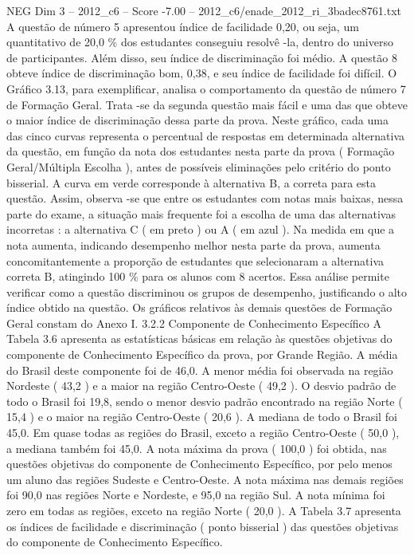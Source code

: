 \begin{textsample}{NEG Dim 3 – 2012\_c6 – Score -7.00 – 2012\_c6/enade\_2012\_ri\_3badec8761.txt}
A questão de número 5 apresentou índice de facilidade 0,20, ou seja, um quantitativo de 20,0 \% dos estudantes conseguiu resolvê -la, dentro do universo de participantes.
Além disso, seu índice de discriminação foi médio.
A questão 8 obteve índice de discriminação bom, 0,38, e seu índice de facilidade foi difícil.
O Gráfico 3.13, para exemplificar, analisa o comportamento da questão de número 7 de Formação Geral.
Trata -se da segunda questão mais fácil e uma das que obteve o maior índice de discriminação dessa parte da prova.
Neste gráfico, cada uma das cinco curvas representa o percentual de respostas em determinada alternativa da questão, em função da nota dos estudantes nesta parte da prova ( Formação Geral/Múltipla Escolha ), antes de possíveis eliminações pelo critério do ponto bisserial.
A curva em verde corresponde à alternativa B, a correta para esta questão.
Assim, observa -se que entre os estudantes com notas mais baixas, nessa parte do exame, a situação mais frequente foi a escolha de uma das alternativas incorretas : a alternativa C ( em preto ) ou A ( em azul ).
Na medida em que a nota aumenta, indicando desempenho melhor nesta parte da prova, aumenta concomitantemente a proporção de estudantes que selecionaram a alternativa correta B, atingindo 100 \% para os alunos com 8 acertos.
Essa análise permite verificar como a questão discriminou os grupos de desempenho, justificando o alto índice obtido na questão.
Os gráficos relativos às demais questões de Formação Geral constam do Anexo I. 3.2.2 Componente de Conhecimento Específico A Tabela 3.6 apresenta as estatísticas básicas em relação às questões objetivas do componente de Conhecimento Específico da prova, por Grande Região.
A média do Brasil deste componente foi de 46,0.
A menor média foi observada na região Nordeste ( 43,2 ) e a maior na região Centro-Oeste ( 49,2 ).
O desvio padrão de todo o Brasil foi 19,8, sendo o menor desvio padrão encontrado na região Norte ( 15,4 ) e o maior na região Centro-Oeste ( 20,6 ).
A mediana de todo o Brasil foi 45,0.
Em quase todas as regiões do Brasil, exceto a região Centro-Oeste ( 50,0 ), a mediana também foi 45,0.
A nota máxima da prova ( 100,0 ) foi obtida, nas questões objetivas do componente de Conhecimento Específico, por pelo menos um aluno das regiões Sudeste e Centro-Oeste.
A nota máxima nas demais regiões foi 90,0 nas regiões Norte e Nordeste, e 95,0 na região Sul.
A nota mínima foi zero em todas as regiões, exceto na região Norte ( 20,0 ).
A Tabela 3.7 apresenta os índices de facilidade e discriminação ( ponto bisserial ) das questões objetivas do componente de Conhecimento Específico.

\end{textsample}

